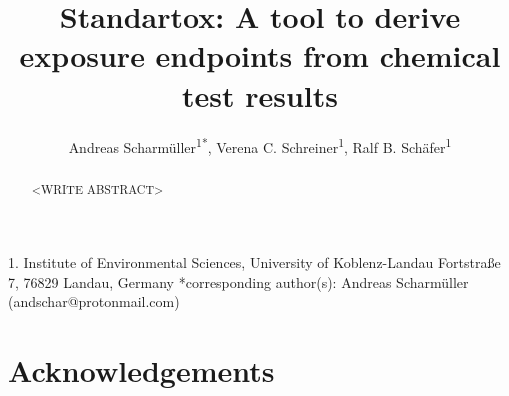 \documentclass[english]{article}
\begin{document}
\title{Standartox: A tool to derive exposure endpoints from chemical test results}

\author{Andreas Scharm{\"u}ller\textsuperscript{1{*}},
        Verena C. Schreiner\textsuperscript{1},
        Ralf B. Sch{\"a}fer\textsuperscript{1}}

\maketitle
\thispagestyle{fancy}

1. Institute of Environmental Sciences, University of Koblenz-Landau Fortstraße 7, 76829 Landau, Germany {*}corresponding author(s):
Andreas Scharm{\"u}ller (andschar@protonmail.com)

\begin{abstract}

<WRITE ABSTRACT>

\end{abstract}
\pagebreak


\pagebreak


\pagebreak


\pagebreak


\pagebreak




\section*{Acknowledgements}
\end{document}
